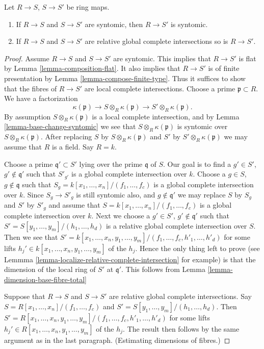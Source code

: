\begin{lemma}
\label{lemma-composition-syntomic}
Let $R \to S$, $S \to S'$ be ring maps.
\begin{enumerate}
\item If $R \to S$ and $S \to S'$ are syntomic, then $R \to S'$
is syntomic.
\item If $R \to S$ and $S \to S'$ are relative global complete intersections
so is $R \to S'$.
\end{enumerate}
\end{lemma}

\begin{proof}
Assume $R \to S$ and $S \to S'$ are syntomic.
This implies that $R \to S'$ is flat by
Lemma \ref{lemma-composition-flat}.
It also implies that $R \to S'$ is of finite presentation by
Lemma \ref{lemma-compose-finite-type}.
Thus it suffices to show that the fibres of $R \to S'$ are
local complete intersections.
Choose a prime $\mathfrak p \subset R$.
We have a factorization
$$
\kappa(\mathfrak p) \to
S \otimes_R \kappa(\mathfrak p) \to
S' \otimes_R \kappa(\mathfrak p).
$$
By assumption $S \otimes_R \kappa(\mathfrak p)$ is
a local complete intersection, and by Lemma \ref{lemma-base-change-syntomic}
we see that $S\otimes_R \kappa(\mathfrak p)$ is syntomic over
$S \otimes_R \kappa(\mathfrak p)$.
After replacing $S$ by $S \otimes_R \kappa(\mathfrak p)$
and $S'$ by $S' \otimes_R \kappa(\mathfrak p)$ we may assume
that $R$ is a field. Say $R = k$.

\medskip\noindent
Choose a prime $\mathfrak q' \subset S'$ lying over the prime
$\mathfrak q$ of $S$. Our goal is to find a $g' \in S'$,
$g' \not \in \mathfrak q'$ such that $S'_{g'}$ is a global complete
intersection over $k$. Choose a $g \in S$, $g \not \in \mathfrak q$
such that $S_g = k[x_1, \ldots, x_n]/(f_1, \ldots, f_c)$ is
a global complete intersection over $k$.
Since $S_g \to S'_g$ is still syntomic also, and $g \not \in \mathfrak q'$
we may replace $S$ by $S_g$ and $S'$ by $S'_g$ and assume that
$S =  k[x_1, \ldots, x_n]/(f_1, \ldots, f_c)$ is
a global complete intersection over $k$. Next we choose a $g' \in S'$,
$g' \not \in \mathfrak q'$ such that
$S' = S[y_1, \ldots, y_m]/(h_1, \ldots, h_d)$
is a relative global complete intersection over $S$.
Then we see that
$S' = k[x_1, \ldots, x_n, y_1, \ldots, y_m]/
(f_1, \ldots, f_c, h'_1, \ldots, h'_d)$ for some
lifts $h_j' \in k[x_1, \ldots, x_n, y_1, \ldots, y_m]$ of the $h_j$.
Hence the only thing left to prove
(see Lemmma \ref{lemma-localize-relative-complete-intersection} for example)
is that the dimension of the local ring of $S'$ at $\mathfrak q'$.
This follows from Lemma \ref{lemma-dimension-base-fibre-total}

\medskip\noindent
Suppose that $R \to S$ and $S \to S'$ are
relative global complete intersections. Say
$S =  R[x_1, \ldots, x_n]/(f_1, \ldots, f_c)$
and
$S' = S[y_1, \ldots, y_m]/(h_1, \ldots, h_d)$.
Then
$S' = R[x_1, \ldots, x_n, y_1, \ldots, y_m]/
(f_1, \ldots, f_c, h'_1, \ldots, h'_d)$ for some
lifts $h_j' \in R[x_1, \ldots, x_n, y_1, \ldots, y_m]$ of the $h_j$.
The result then follows by the same argument as in the last paragraph.
(Estimating dimensions of fibres.)
\end{proof}


